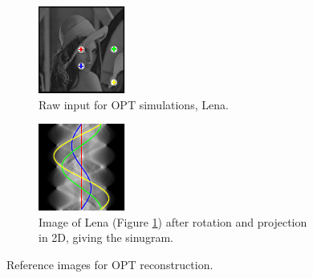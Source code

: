 \begin{figure}
  \centering
  \hfill
  \begin{subfigure}[t]{0.3\textwidth}
    \includegraphics[width=\textwidth]{Chapters/flopt/Figs/PDF/results/no_helix/rawinput_colour}
    \caption{Raw input for OPT simulations, Lena.}
    \label{fig:raw_input}
  \end{subfigure}\hfill
  \begin{subfigure}[t]{0.3\textwidth}
    \includegraphics[width=\textwidth]{Chapters/flopt/Figs/PDF/results/no_helix/sinugram_stretch}
    \caption{Image of Lena (Figure \ref{fig:raw_input}) after rotation and projection in 2D, giving the sinugram.}
    \label{fig:sinugram_stretch}
  \end{subfigure}
  \hfill
  \label{fig:rawinputs}
  \caption{Reference images for OPT reconstruction.}
\end{figure}

